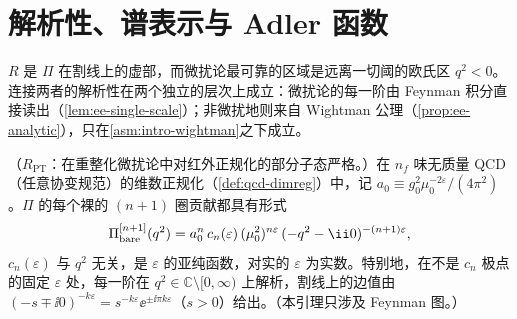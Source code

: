 \section{解析性、谱表示与 Adler 函数}\label{sec:ee-analytic}

$R$ 是 $\Pi$ 在割线上的虚部，而微扰论最可靠的区域是远离一切阈的欧氏区 $q^2<0$。连接两者的解析性在两个独立的层次上成立：微扰论的每一阶由 Feynman 积分直接读出（\cref{lem:ee-single-scale}）；非微扰地则来自 Wightman 公理（\cref{prop:ee-analytic}），只在\cref{asm:intro-wightman}之下成立。

\begin{lemma}\label{lem:ee-single-scale}
（$R_{\mathrm{PT}}$：在重整化微扰论中对红外正规化的部分子态严格。）在 $n_f$ 味无质量 QCD（任意协变规范）的维数正规化（\cref{def:qcd-dimreg}）中，记 $a_0\equiv g_0^2\mu_0^{-2\varepsilon}/(4\pi^2)$。$\Pi$ 的每个裸的 $(n+1)$ 圈贡献都具有形式
\begin{equation}\label{eq:ee-single-scale}
\Pi^{[n+1]}_{\rm bare}(q^2)=a_0^n\,c_n(\varepsilon)\,(\mu_0^2)^{n\varepsilon}\,(-q^2-\ii0)^{-(n+1)\varepsilon},
\end{equation}
$c_n(\varepsilon)$ 与 $q^2$ 无关，是 $\varepsilon$ 的亚纯函数，对实的 $\varepsilon$ 为实数。特别地，在不是 $c_n$ 极点的固定 $\varepsilon$ 处，每一阶在 $q^2\in\mathbb C\setminus[0,\infty)$ 上解析，割线上的边值由 $(-s\mp\ii0)^{-k\varepsilon}=s^{-k\varepsilon}\ee^{\pm\ii\pi k\varepsilon}$（$s>0$）给出。（本引理只涉及 Feynman 图。）
\end{lemma}
